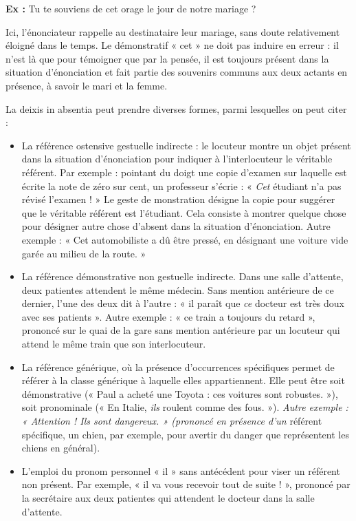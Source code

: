 \textbf{Ex :} Tu te souviens de cet orage le jour de notre mariage ?

Ici, l’énonciateur rappelle au destinataire leur mariage, sans doute relativement éloigné dans le temps. Le démonstratif « cet » ne doit pas induire en erreur : il n’est là que pour témoigner que par la pensée, il est toujours présent dans la situation d’énonciation et fait partie des souvenirs communs aux deux actants en présence, à savoir le mari et la femme.

La deixis in absentia peut prendre diverses formes, parmi lesquelles on peut citer :

\begin{itemize}
\item La référence ostensive gestuelle indirecte : le locuteur montre un objet présent dans la situation d’énonciation pour indiquer à l’interlocuteur le véritable référent. Par exemple : pointant du doigt une copie d’examen sur laquelle est écrite la note de zéro sur cent, un professeur s’écrie : « \textit{Cet} étudiant n’a pas révisé l’examen ! » Le geste de monstration désigne la copie pour suggérer que le véritable référent est l’étudiant. Cela consiste à montrer quelque chose pour désigner autre chose d’absent dans la situation d’énonciation. Autre exemple : « Cet automobiliste a dû être pressé, en désignant une voiture vide garée au milieu de la route. »
\item La référence démonstrative non gestuelle indirecte. Dans une salle d’attente, deux patientes attendent le même médecin. Sans mention antérieure de ce dernier, l’une des deux dit à l’autre : « il paraît que \textit{ce} docteur est très doux avec ses patients ». Autre exemple : « ce train a toujours du retard », prononcé sur le quai de la gare sans mention antérieure par un locuteur qui attend le même train que son interlocuteur.
\item La référence générique, où la présence d’occurrences spécifiques permet de référer à la classe générique à laquelle elles appartiennent. Elle peut être soit démonstrative (« Paul a acheté une Toyota : ces voitures sont robustes. »), soit pronominale (« En Italie, \textit{ils} roulent comme des fous. »). \textit{Autre exemple : « Attention ! Ils sont dangereux. » (prononcé en présence d’un} référent spécifique, un chien, par exemple, pour avertir du danger que représentent les chiens en général).
\item L’emploi du pronom personnel « il » sans antécédent pour viser un référent non présent. Par exemple, « il va vous recevoir tout de suite ! », prononcé par la secrétaire aux deux patientes qui attendent le docteur dans la salle d’attente.
\end{itemize}

